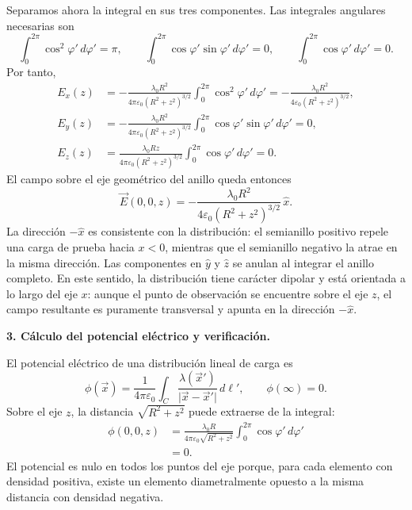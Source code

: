 \documentclass[11pt]{article}
\begin{document}
Separamos ahora la integral en sus tres componentes. Las integrales angulares
necesarias son
\[
\int_0^{2\pi}\cos^2\varphi'\,d\varphi'=\pi,
\qquad
\int_0^{2\pi}\cos\varphi'\sin\varphi'\,d\varphi'=0,
\qquad
\int_0^{2\pi}\cos\varphi'\,d\varphi'=0.
\]
Por tanto,
\begin{equation}
\begin{aligned}
E_x(z)
&=-\frac{\lambda_0R^2}
{4\pi\varepsilon_0(R^2+z^2)^{3/2}}
\int_0^{2\pi}\cos^2\varphi'\,d\varphi'
=-\frac{\lambda_0R^2}
{4\varepsilon_0(R^2+z^2)^{3/2}},\\[3pt]
E_y(z)
&=-\frac{\lambda_0R^2}
{4\pi\varepsilon_0(R^2+z^2)^{3/2}}
\int_0^{2\pi}\cos\varphi'\sin\varphi'\,d\varphi'=0,\\[3pt]
E_z(z)
&=\frac{\lambda_0Rz}
{4\pi\varepsilon_0(R^2+z^2)^{3/2}}
\int_0^{2\pi}\cos\varphi'\,d\varphi'=0.
\end{aligned}
\label{eq:componentes}
\end{equation}
El campo sobre el eje geométrico del anillo queda entonces
\begin{equation}
\boxed{
\vec E(0,0,z)
=-\frac{\lambda_0R^2}
{4\varepsilon_0(R^2+z^2)^{3/2}}\,\hat x.}
\label{eq:campo-final}
\end{equation}
La dirección $-\hat x$ es consistente con la distribución: el semianillo
positivo repele una carga de prueba hacia $x<0$, mientras que el semianillo
negativo la atrae en la misma dirección. Las componentes en $\hat y$ y $\hat z$
se anulan al integrar el anillo completo. En este sentido, la distribución tiene
carácter dipolar y está orientada a lo largo del eje $x$: aunque el punto de
observación se encuentre sobre el eje $z$, el campo resultante es puramente
transversal y apunta en la dirección $-\hat x$.

\textbf{3. Cálculo del potencial eléctrico y verificación.}\par
El potencial eléctrico de una distribución lineal de carga es
\begin{equation}
\phi(\vec x)=\frac{1}{4\pi\varepsilon_0}
\int_C\frac{\lambda(\vec x')}
{\lvert\vec x-\vec x'\rvert}\,d\ell',
\qquad \phi(\infty)=0.
\label{eq:potencial}
\end{equation}
Sobre el eje $z$, la distancia $\sqrt{R^2+z^2}$ puede extraerse de la integral:
\begin{equation}
\begin{aligned}
\phi(0,0,z)
&=\frac{\lambda_0R}
{4\pi\varepsilon_0\sqrt{R^2+z^2}}
\int_0^{2\pi}\cos\varphi'\,d\varphi'\\
&=0.
\end{aligned}
\label{eq:potencial-eje}
\end{equation}
El potencial es nulo en todos los puntos del eje porque, para cada elemento con
densidad positiva, existe un elemento diametralmente opuesto a la misma distancia
con densidad negativa.
\end{document}
